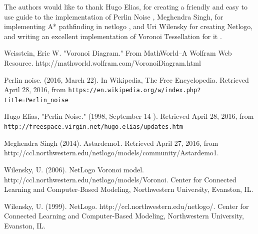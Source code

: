 \documentclass[conference]{IEEEtran}
\begin{document}
The authors would like to thank Hugo Elias, for creating a friendly and easy to use guide to the implementation of Perlin Noise \cite{elias:perlin}, Meghendra Singh, for implementing A* pathfinding in netlogo \cite{singh:astar}, and Uri Wilensky for creating Netlogo, and writing an excellent implementation of Voronoi Tessellation for it \cite{wilensky:voronoi} \cite{wilensky:netlogo}.







%
%
%
\begin{thebibliography}{1}
Weisstein, Eric W. "Voronoi Diagram." From MathWorld--A Wolfram Web Resource. http://mathworld.wolfram.com/VoronoiDiagram.html

Perlin noise. (2016, March 22). In Wikipedia, The Free Encyclopedia. Retrieved  April 28, 2016, from \verb+https://en.wikipedia.org/w/index.php?title=Perlin_noise+

Hugo Elias, "Perlin Noise." (1998, September 14 ). Retrieved April 28, 2016, from \verb+http://freespace.virgin.net/hugo.elias/updates.htm+

Meghendra Singh (2014). Astardemo1. Retrieved April 27, 2016, from http://ccl.northwestern.edu/netlogo/models/community/Astardemo1.

Wilensky, U. (2006). NetLogo Voronoi model. http://ccl.northwestern.edu/netlogo/models/Voronoi. Center for Connected Learning and Computer-Based Modeling, Northwestern University, Evanston, IL.

Wilensky, U. (1999). NetLogo. http://ccl.northwestern.edu/netlogo/. Center for Connected Learning and Computer-Based Modeling, Northwestern University, Evanston, IL.

\end{thebibliography}

\end{document}
